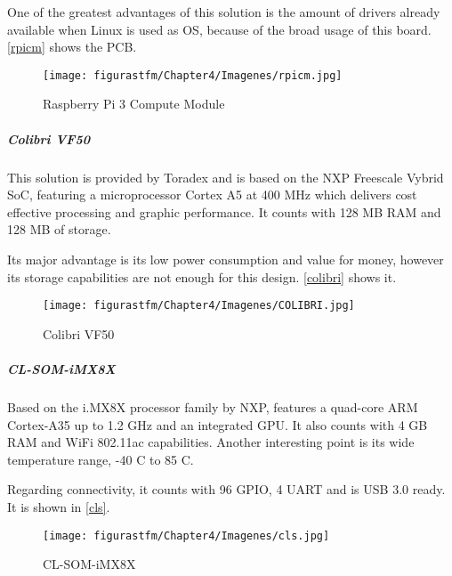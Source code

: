 One of the greatest advantages of this solution is the amount of drivers already available when Linux is used as \acrshort{OS}, because of the broad usage of this board. \autoref{rpicm} shows the \acrshort{PCB}.


\begin{figure} [H]
			\centering
			\texttt{[image: figurastfm/Chapter4/Imagenes/rpicm.jpg]}
			\caption{Raspberry Pi 3 Compute Module \cite{cm3}} \label{rpicm}
\end{figure}


\subparagraph{Colibri VF50}


This solution is provided by Toradex \cite{colibrivf50} and is based on the NXP Freescale Vybrid \acrshort{SoC}, featuring a microprocessor Cortex A5 at 400 MHz which delivers cost effective processing and graphic performance. It counts with 128 MB RAM and 128 MB of storage.

Its major advantage is its low power consumption and value for money, however its storage capabilities are not enough for this design. \autoref{colibri} shows it.

\begin{figure} [H]
			\centering
			\texttt{[image: figurastfm/Chapter4/Imagenes/COLIBRI.jpg]}
			\caption{Colibri VF50 \cite{colibrivf50}} \label{colibri}
\end{figure}

\subparagraph{CL-SOM-iMX8X}

Based on the i.MX8X processor family by NXP, features a quad-core ARM Cortex-A35 up to 1.2 GHz and an integrated GPU. It also counts with 4 GB RAM and WiFi 802.11ac capabilities. Another interesting point is its wide temperature range, -40 \textdegree C to 85 \textdegree C.

Regarding connectivity, it counts with 96 \acrshort{GPIO}, 4 \acrshort{UART} and is \acrshort{USB} 3.0 ready. It is shown in \autoref{cls}.

\begin{figure} [H]
			\centering
			\texttt{[image: figurastfm/Chapter4/Imagenes/cls.jpg]}
			\caption{CL-SOM-iMX8X} \label{cls}
\end{figure}


